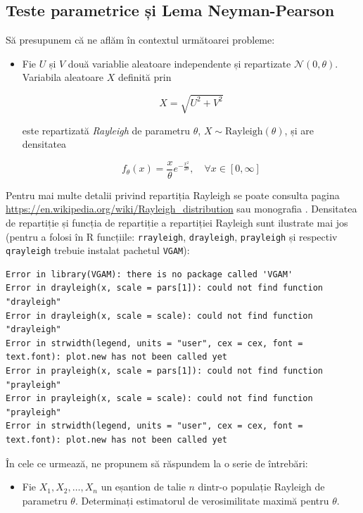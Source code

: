 \documentclass[]{article}
\newenvironment{frshaded*}{%
  \def\FrameCommand{\fboxrule=\FrameRule\fboxsep=\FrameSep \fcolorbox{framecolor}{shadecolor1}}%
  \MakeFramed {\advance\hsize-\width \FrameRestore}}%
{\endMakeFramed}
\newenvironment{rmdblock}[1]
  {\begin{frshaded*}
  \begin{itemize}
  \renewcommand{\labelitemi}{
    \raisebox{-.7\height}[0pt][0pt]{
      {\setkeys{Gin}{width=2em,keepaspectratio}\texttt{[image: images/icons/\#1]}}
    }
  }
  \item
  }
  {
  \end{itemize}
  \end{frshaded*}
  }
\newenvironment{rmdexercise}
  {\begin{rmdblock}{exercise}}
  {\end{rmdblock}}
\begin{document}
\subsection{Teste parametrice și Lema
Neyman-Pearson}\label{teste-parametrice-si-lema-neyman-pearson}

Să presupunem că ne aflăm în contextul următoarei probleme:

\begin{rmdexercise}
Fie \(U\) și \(V\) două variablie aleatoare independente și repartizate
\(\mathcal{N}(0, \theta)\). Variabila aleatoare \(X\) definită prin

\[
    X = \sqrt{U^2 + V^2}
\]

este repartizată \emph{Rayleigh} de parametru \(\theta\),
\(X\sim \text{Rayleigh}(\theta)\), și are densitatea

\[
  f_{\theta}(x) = \frac{x}{\theta}e^{-\frac{x^2}{2\theta}},\quad \forall x\in[0,\infty]
\]
\end{rmdexercise}

Pentru mai multe detalii privind repartiția Rayleigh se poate consulta
pagina \url{https://en.wikipedia.org/wiki/Rayleigh_distribution} sau
monografia \citep{Evans2000}. Densitatea de repartiție și funcția de
repartiție a repartiției Rayleigh sunt ilustrate mai jos (pentru a
folosi în R funcțiile: \texttt{rrayleigh}, \texttt{drayleigh},
\texttt{prayleigh} și respectiv \texttt{qrayleigh} trebuie instalat
pachetul \texttt{VGAM}):

\begin{verbatim}
Error in library(VGAM): there is no package called 'VGAM'
Error in drayleigh(x, scale = pars[1]): could not find function "drayleigh"
Error in drayleigh(x, scale = scale): could not find function "drayleigh"
Error in strwidth(legend, units = "user", cex = cex, font = text.font): plot.new has not been called yet
Error in prayleigh(x, scale = pars[1]): could not find function "prayleigh"
Error in prayleigh(x, scale = scale): could not find function "prayleigh"
Error in strwidth(legend, units = "user", cex = cex, font = text.font): plot.new has not been called yet
\end{verbatim}

În cele ce urmează, ne propunem să răspundem la o serie de întrebări:

\begin{rmdexercise}
Fie \(X_1, X_2, \ldots, X_n\) un eșantion de talie \(n\) dintr-o
populație Rayleigh de parametru \(\theta\). Determinați estimatorul de
verosimilitate maximă pentru \(\theta\).
\end{rmdexercise}
\end{document}
